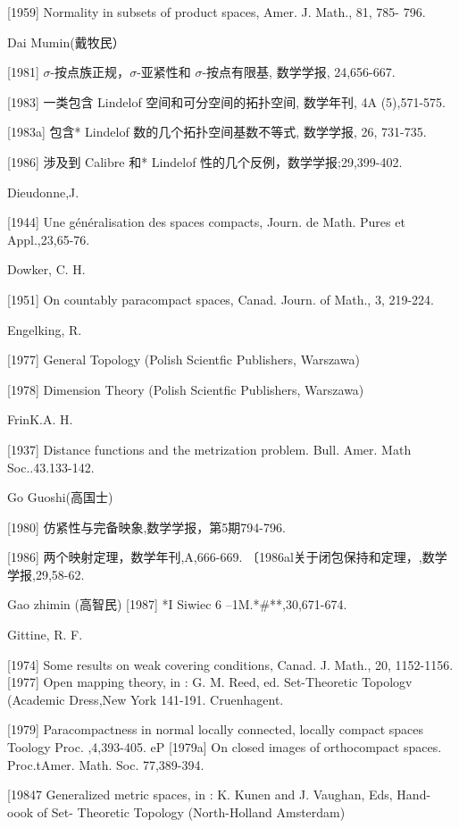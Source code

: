 \documentclass[main.tex]{subfiles}
\begin{document}
[1959] Normality in subsets of product spaces, Amer. J. Math., 81, 785-
796.

\noindent Dai Mumin(戴牧民）

[1981] $\sigma$-按点族正规，$\sigma$-亚紧性和 $\sigma$-按点有限基, 数学学报, 24,656-667.

[1983] 一类包含 Lindelof 空间和可分空间的拓扑空间, 数学年刊, 4A
(5),571-575.

[1983a] 包含* Lindelof 数的几个拓扑空间基数不等式, 数学学报, 26, 731-735.

[1986] 涉及到 Calibre 和* Lindelof 性的几个反例，数学学报;29,399-402.
	
\noindent Dieudonne,J.

[1944] Une généralisation des spaces compacts, Journ. de Math. Pures et Appl.,23,65-76.

\noindent Dowker, C. H.

[1951] On countably paracompact spaces, Canad. Journ. of Math., 3, 219-224.

\noindent Engelking, R.

[1977] General Topology (Polish Scientfic Publishers, Warszawa)

[1978] Dimension Theory (Polish Scientfic Publishers, Warszawa)


\noindent FrinK.A. H.

[1937] Distance functions and the metrization problem. Bull. Amer. Math
Soc..43.133-142.

\noindent Go Guoshi(高国士)

[1980] 仿紧性与完备映象,数学学报，第5期794-796.

[1986] 两个映射定理，数学年刊,A,666-669.
〔1986al关于闭包保持和定理，,数学学报,29,58-62.

\noindent Gao zhimin (高智民)
[1987] *I Siwiec 6 --1M.*\#**,30,671-674.

\noindent Gittine, R. F.

[1974]
Some results on weak covering conditions, Canad. J. Math., 20,
1152-1156.
[1977]
Open mapping theory, in : G. M. Reed, ed. Set-Theoretic Topologv
(Academic Dress,New York 141-191.
Cruenhagent.

[1979]
Paracompactness in normal locally connected,
locally compact
spaces Toology Proc.
,4,393-405.
eP [1979a]
On closed images of orthocompact
spaces. Proc.tAmer. Math. Soc.
77,389-394.

[19847 Generalized metric spaces, in : K. Kunen and J. Vaughan, Eds, Hand-
oook of Set- Theoretic Topology (North-Holland Amsterdam)
\end{document}
